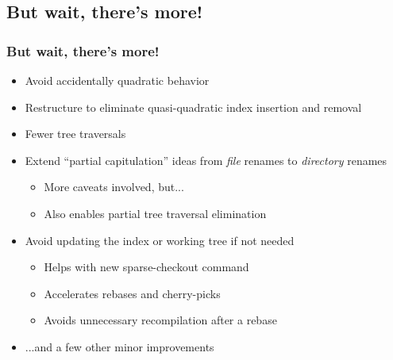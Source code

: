 \documentclass[compress,t]{beamer}
\begin{document}
\subsection[Honing]{But wait, there's more!}
\begin{frame}
  \frametitle{But wait, there's more!}

  \begin{itemize}[<+(1)->]

    \item Avoid accidentally quadratic behavior

    \item Restructure to eliminate quasi-quadratic index insertion and
          removal

    \item Fewer tree traversals

    \item Extend ``partial capitulation'' ideas from \textit{file}
          renames to \textit{directory} renames

      \begin{itemize}
        \item More caveats involved, but...
        \item Also enables partial tree traversal elimination
      \end{itemize}

    \item Avoid updating the index or working tree if not needed

      \begin{itemize}
        \item Helps with new sparse-checkout command
        \item Accelerates rebases and cherry-picks
        \item Avoids unnecessary recompilation after a rebase
      \end{itemize}

    \item ...and a few other minor improvements

  \end{itemize}

\end{frame}

\end{document}
